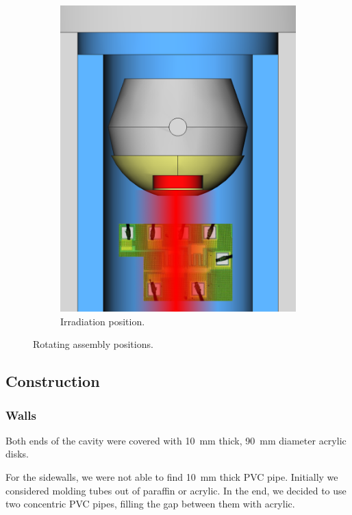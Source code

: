 \begin{figure}[H]
\begin{subfigure}[b]{.45\textwidth}
        \includegraphics{figuras/poster/posicion_si.png}
        \caption{Irradiation position.}
        \label{fig:posicionsi}
    \end{subfigure}
    \caption{Rotating assembly positions.}
    \label{fig:posicionespieza}
\end{figure}
\subsection{Construction}
\subsubsection{Walls}
Both ends of the cavity were covered with 
\SI{10}{\milli\meter} thick, \SI{90}{\milli\meter} diameter acrylic disks.

For the sidewalls, we were not able to find \SI{10}{\milli\meter} thick PVC pipe.
Initially we considered molding tubes out of paraffin or acrylic.
In the end, we decided to use two concentric PVC pipes,
filling the gap between them with acrylic.
